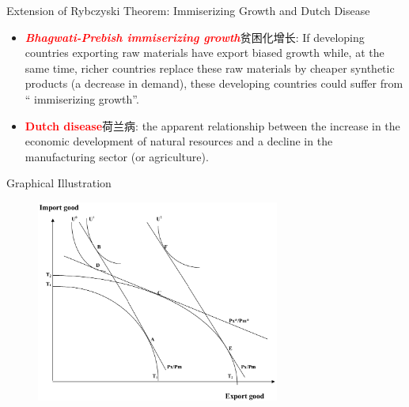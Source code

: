 \documentclass[10pt,hyperref={CJKbookmarks=true},xcolor=dvipsnames,aspectratio=169]{beamer}
\begin{document}
\begin{frame}{Extension of Rybczyski Theorem: Immiserizing Growth and Dutch Disease}

\begin{itemize}
\item \textbf{\textit{\textcolor{red}{Bhagwati-Prebish immiserizing growth}}}贫困化增长:
If developing countries exporting raw materials have export biased
growth while, at the same time, richer countries replace these raw
materials by cheaper synthetic products (a decrease in demand), these
developing countries could suffer from “ immiserizing growth”.
\item \textbf{\textcolor{red}{Dutch disease}}荷兰病: the apparent relationship
between the increase in the economic development of natural resources
and a decline in the manufacturing sector (or agriculture).
\end{itemize}
\end{frame}

\begin{frame}{Graphical Illustration}


\begin{figure}


\begin{centering}
\includegraphics[width=8cm]{fig/ho/lec5-22}
\par\end{centering}

\end{figure}

\end{frame}
\end{document}
